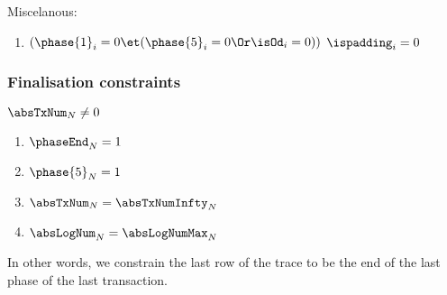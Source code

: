 \noindent Miscelanous:
\begin{enumerate}[resume]
    \item \If $(\phase{1}_{i}=0 \et (\phase{5}_{i}=0 \Or \isOd_{i}=0))$ \Then $\ispadding_{i}=0$
\end{enumerate}

\subsubsection{Finalisation constraints}
\If $\absTxNum_{N} \neq 0$ \Then
\begin{enumerate}
    \item $\phaseEnd_{N}=1$
    \item $\phase{5}_{N}=1$
    \item $\absTxNum_{N}=\absTxNumInfty_{N}$
    \item $\absLogNum_{N}=\absLogNumMax_{N}$
\end{enumerate}
In other words, we constrain the last row of the trace to be the end of the last phase of the last transaction.
